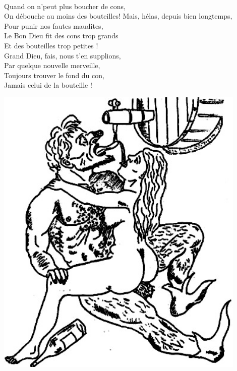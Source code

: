 \\Quand on n'peut plus boucher de cons,
\\On débouche au moins des bouteilles! \bissimple
\breakpage
Mais, hélas, depuis bien longtemps,
\\Pour punir nos fautes maudites,
\\Le Bon Dieu fit des cons trop grands
\\Et des bouteilles trop petites !
\\Grand Dieu, fais, nous t'en supplions,
\\Par quelque nouvelle merveille,
\\Toujours trouver le fond du con,
\\Jamais celui de la bouteille ! \bissimple
\bigskip
\begin{center}
\includegraphics[width=0.9\textwidth]{images/le_con_et_la_bouteille.jpg}
\end{center}

\breakpage